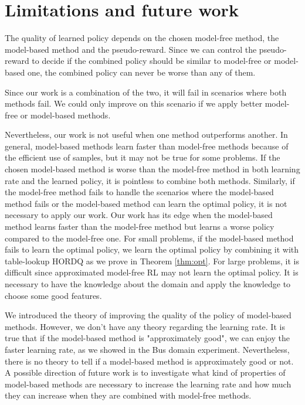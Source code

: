 \section{Limitations and future work}

The quality of learned policy depends on the chosen model-free method,
the model-based method and the pseudo-reward. 
Since we can control the pseudo-reward to decide if the combined
policy should be similar to model-free or model-based one,
the combined policy can never be worse than any of them. 

Since our work is a combination of the two, it will fail in scenarios where both methods fail. 
We could only improve on this scenario if we apply better model-free or model-based methods. 


Nevertheless, our work is not useful when one method outperforms another.
In general, model-based methods learn faster than model-free methods because of
the efficient use of samples, but it may not be true for some problems. 
If the chosen model-based method is worse than the model-free method in both learning
rate and the learned policy, it is pointless to combine both methods. 
Similarly, if the model-free method fails to handle the scenarios where the model-based
method fails or the model-based method can learn the optimal policy, it is not necessary to apply our work.
Our work has its edge when the model-based method learns faster than the model-free method but learns
a worse policy compared to the model-free one.
For small problems, if the model-based method fails to learn the optimal policy, 
we learn the optimal policy by combining it with table-lookup HORDQ as we prove in Theorem \ref{thm:opt}.
For large problems, it is difficult since approximated model-free RL may not learn the optimal policy.
It is necessary to have the knowledge about the domain and apply the knowledge to choose some good features.


We introduced the theory of improving the quality of the policy of model-based methods. However, we don't have any theory regarding the learning rate.
It is true that if the model-based method is "approximately good", we can enjoy the 
faster learning rate, as we showed in the Bus domain experiment. Nevertheless, there is no theory to tell if a model-based method is approximately good or not.
A possible direction of future work is to investigate what kind of properties of model-based
methods are necessary to increase the learning rate and how much they can increase when they are combined with model-free methods.

